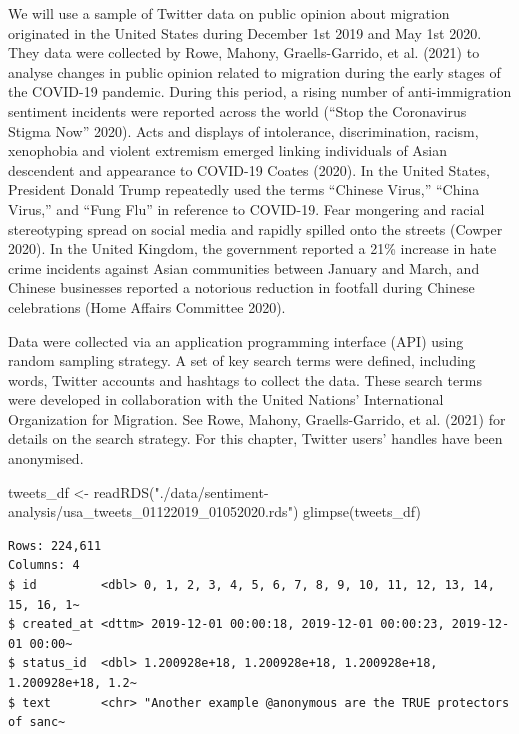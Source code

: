 \documentclass[
  letterpaper,
  DIV=11,
  numbers=noendperiod]{scrreprt}
\newenvironment{Shaded}{\begin{snugshade}}{\end{snugshade}}
\newcommand{\FunctionTok}[1]{\textcolor[rgb]{0.28,0.35,0.67}{#1}}
\newcommand{\NormalTok}[1]{\textcolor[rgb]{0.00,0.23,0.31}{#1}}
\newcommand{\OtherTok}[1]{\textcolor[rgb]{0.00,0.23,0.31}{#1}}
\newcommand{\StringTok}[1]{\textcolor[rgb]{0.13,0.47,0.30}{#1}}
\begin{document}
We will use a sample of Twitter data on public opinion about migration
originated in the United States during December 1st 2019 and May 1st
2020. They data were collected by Rowe, Mahony, Graells-Garrido, et al.
(2021) to analyse changes in public opinion related to migration during
the early stages of the COVID-19 pandemic. During this period, a rising
number of anti-immigration sentiment incidents were reported across the
world ({``Stop the Coronavirus Stigma Now''} 2020). Acts and displays of
intolerance, discrimination, racism, xenophobia and violent extremism
emerged linking individuals of Asian descendent and appearance to
COVID-19 Coates (2020). In the United States, President Donald Trump
repeatedly used the terms ``Chinese Virus,'' ``China Virus,'' and ``Fung
Flu'' in reference to COVID-19. Fear mongering and racial stereotyping
spread on social media and rapidly spilled onto the streets (Cowper
2020). In the United Kingdom, the government reported a 21\% increase in
hate crime incidents against Asian communities between January and
March, and Chinese businesses reported a notorious reduction in footfall
during Chinese celebrations (Home Affairs Committee 2020).

Data were collected via an application programming interface (API) using
random sampling strategy. A set of key search terms were defined,
including words, Twitter accounts and hashtags to collect the data.
These search terms were developed in collaboration with the United
Nations' International Organization for Migration. See Rowe, Mahony,
Graells-Garrido, et al. (2021) for details on the search strategy. For
this chapter, Twitter users' handles have been anonymised.

\begin{Shaded}
\begin{Highlighting}[]
\NormalTok{tweets\_df }\OtherTok{\textless{}{-}} \FunctionTok{readRDS}\NormalTok{(}\StringTok{"./data/sentiment{-}analysis/usa\_tweets\_01122019\_01052020.rds"}\NormalTok{)}
\FunctionTok{glimpse}\NormalTok{(tweets\_df)}
\end{Highlighting}
\end{Shaded}

\begin{verbatim}
Rows: 224,611
Columns: 4
$ id         <dbl> 0, 1, 2, 3, 4, 5, 6, 7, 8, 9, 10, 11, 12, 13, 14, 15, 16, 1~
$ created_at <dttm> 2019-12-01 00:00:18, 2019-12-01 00:00:23, 2019-12-01 00:00~
$ status_id  <dbl> 1.200928e+18, 1.200928e+18, 1.200928e+18, 1.200928e+18, 1.2~
$ text       <chr> "Another example @anonymous are the TRUE protectors of sanc~
\end{verbatim}
\end{document}
